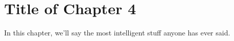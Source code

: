 \chapter{Title of Chapter 4}

In this chapter, we'll say the most intelligent stuff anyone has ever said.